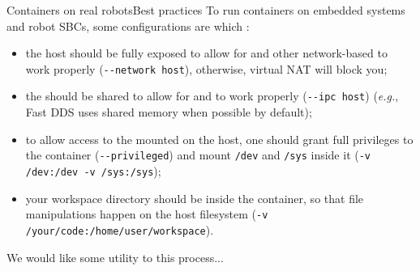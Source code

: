 \begin{frame}{Containers on real robots}{Best practices}
  \justifying
  To run containers on embedded systems and robot SBCs, some configurations are  which :
  \begin{itemize}
    \item the host  should be fully exposed to allow for  and other network-based  to work properly (\texttt{-{}-network host}), otherwise, virtual NAT will block you;
    \item the  should be shared to allow for  and  to work properly (\texttt{-{}-ipc host}) (\emph{e.g.}, Fast DDS uses shared memory when possible by default);
    \item to allow access to the  mounted on the host, one should grant full privileges to the container (\texttt{-{}-privileged}) and mount \texttt{/dev} and \texttt{/sys} inside it (\texttt{-v /dev:/dev -v /sys:/sys});
    \item your workspace directory should be  inside the container, so that file manipulations happen on the host filesystem (\texttt{-v /your/code:/home/user/workspace}).
  \end{itemize}
  We would like some utility to  this process...
\end{frame}
